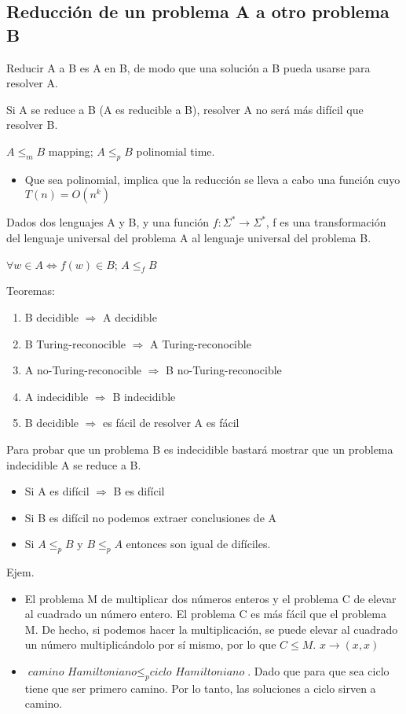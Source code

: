 \subsection{Reducción de un problema A a otro problema B}
Reducir A a B es A en B, de modo que una solución a B pueda usarse para resolver A.

Si A se reduce a B (A es reducible a B), resolver A no será más difícil que resolver B.

$A \leq_m B$ mapping; $A \leq_p B$ polinomial time.
\begin{itemize}
	\item Que sea polinomial, implica que la reducción se lleva a cabo una función cuyo $T(n)= O(n^k)$
\end{itemize}

Dados dos lenguajes A y B, y una función $f:\Sigma^* \rightarrow \Sigma^*$, f es una transformación del lenguaje universal del problema A al lenguaje universal del problema B.

$\forall w\in A \Leftrightarrow f(w)\in B$; $ A \leq_f B$

Teoremas:
\begin{enumerate}
	\item B decidible $\Rightarrow$ A decidible
	\item B Turing-reconocible $\Rightarrow$ A Turing-reconocible
	\item A no-Turing-reconocible $\Rightarrow$ B no-Turing-reconocible
	\item A indecidible $\Rightarrow$ B indecidible
	\item B decidible $\Rightarrow$ es fácil de resolver A es fácil
\end{enumerate}

Para probar que un problema B es indecidible bastará mostrar que un problema indecidible A se reduce a B.
\begin{itemize}
	\item Si A es difícil $\Rightarrow$ B es difícil
	\item Si B es difícil no podemos extraer conclusiones de A
	\item Si $A \leq_p B$ y $B \leq_p A$ entonces son igual de difíciles.
\end{itemize}

Ejem.
\begin{itemize}
	\item El problema M de multiplicar dos números enteros y el problema C de elevar al cuadrado un número entero. El problema C es más fácil que el problema M. De hecho, si podemos hacer la multiplicación, se puede elevar al cuadrado un número multiplicándolo por sí mismo, por lo que $C \leq M$. $x \rightarrow (x,x)$
	\item $\textit{camino Hamiltoniano} \leq_p \textit{ciclo Hamiltoniano}$. Dado que para que sea ciclo tiene que ser primero camino. Por lo tanto, las soluciones a ciclo sirven a camino.
\end{itemize}

